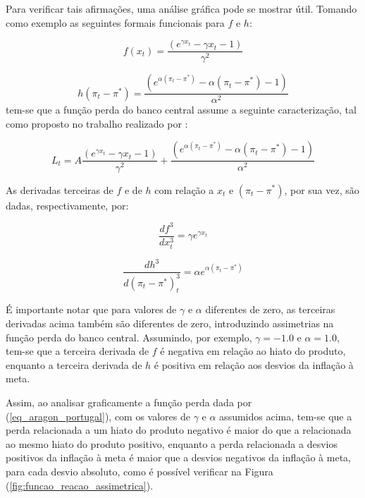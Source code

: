 \documentclass[
	article,			%
	11pt,				%
	oneside,			%
	a4paper,			%
	english,			%
	brazil,				%
	]{abntex2}
\begin{document}
	Para verificar tais afirmações, uma análise gráfica pode se mostrar útil. Tomando como exemplo as seguintes formais funcionais para $f$ e $h$:
	
	\begin{equation}
		f(x_t) = \frac{(e^{\gamma x_t} - \gamma x_t - 1)}{\gamma^2} 
	\end{equation}
	
	\begin{equation}	
		h(\pi_t - \pi^*) = \frac{(e^{\alpha (\pi_t - \pi^*)} - \alpha (\pi_t - \pi^*) - 1)}{\alpha^2}
	\end{equation}
%
	tem-se que a função perda do banco central assume a seguinte caracterização, tal como proposto no trabalho realizado por :
	
	\begin{equation} \label{eq_aragon_portugal}
		L_t = A \frac{(e^{\gamma x_t} - \gamma x_t - 1)}{\gamma^2} + \frac{(e^{\alpha (\pi_t - \pi^*)} - \alpha (\pi_t - \pi^*) - 1)}{\alpha^2}
	\end{equation}
	
	As derivadas terceiras de $f$ e de $h$ com relação a $x_t$ e $(\pi_t - \pi^*)$, por sua vez, são dadas, respectivamente, por:
	
	\begin{equation}
		\frac{df^3}{dx_t^3} = \gamma e^{\gamma x_t}
	\end{equation}
	
	\begin{equation}
		\frac{dh^3}{d(\pi_t - \pi^*)_t^3} = \alpha e^{\alpha (\pi_t - \pi^*)}
	\end{equation}
	
	É importante notar que para valores de $\gamma$ e $\alpha$ diferentes de zero, as terceiras derivadas acima também são diferentes de zero, introduzindo assimetrias na função perda do banco central. Assumindo, por exemplo, $\gamma = -1.0$ e $\alpha = 1.0$, tem-se que a terceira derivada de $f$ é negativa em relação ao hiato do produto, enquanto a terceira derivada de $h$ é positiva em relação aos desvios da inflação à meta.
	
	Assim, ao analisar graficamente a função perda dada por (\ref{eq_aragon_portugal}), com os valores de $\gamma$ e $\alpha$ assumidos acima, tem-se que a perda relacionada a um hiato do produto negativo é maior do que a relacionada ao mesmo hiato do produto positivo, enquanto a perda relacionada a desvios positivos da inflação à meta é maior que a desvios negativos da inflação à meta, para cada desvio absoluto, como é possível verificar na Figura (\ref{fig:funcao_reacao_assimetrica}).
		
\end{document}
